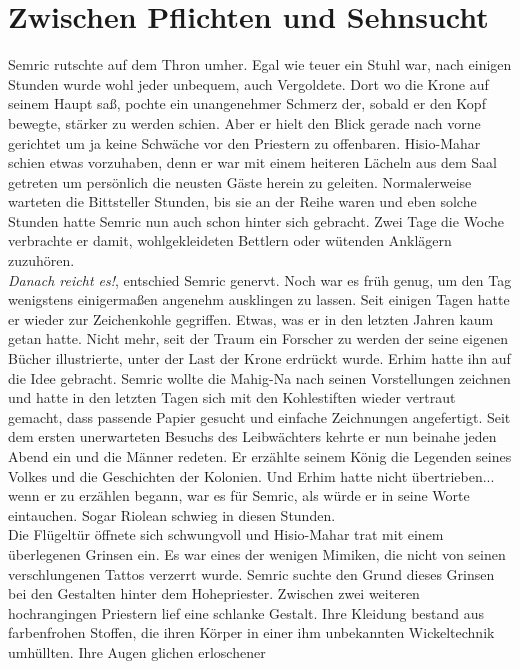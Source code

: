 \chapter{Zwischen Pflichten und Sehnsucht}

Semric rutschte auf dem Thron umher. Egal wie teuer ein Stuhl war, nach einigen Stunden wurde wohl 
jeder unbequem, auch Vergoldete. Dort wo die Krone auf seinem Haupt saß, pochte ein unangenehmer 
Schmerz der, sobald er den Kopf bewegte, stärker zu werden schien. Aber er hielt den Blick gerade 
nach vorne gerichtet um ja keine Schwäche vor den Priestern zu offenbaren. Hisio-Mahar schien etwas 
vorzuhaben, denn er war mit einem heiteren Lächeln aus dem Saal getreten um persönlich die neusten 
Gäste herein zu geleiten. Normalerweise warteten die Bittsteller Stunden, bis sie an der Reihe 
waren und eben solche Stunden hatte Semric nun auch schon hinter sich gebracht. Zwei Tage die Woche 
verbrachte er damit, wohlgekleideten Bettlern oder wütenden Anklägern zuzuhören.\\
\textit{Danach reicht es!}, entschied Semric genervt. Noch war es früh genug, um den Tag wenigstens 
einigermaßen angenehm ausklingen zu lassen. Seit einigen Tagen hatte er wieder zur Zeichenkohle 
gegriffen. Etwas, was er in den letzten Jahren kaum getan hatte. Nicht mehr, seit der Traum ein 
Forscher zu werden der seine eigenen Bücher illustrierte, unter der Last der Krone erdrückt wurde. 
Erhim hatte ihn auf die Idee gebracht. Semric wollte die Mahig-Na nach seinen Vorstellungen 
zeichnen und hatte in den letzten Tagen sich mit den Kohlestiften wieder vertraut gemacht, dass 
passende Papier gesucht und einfache Zeichnungen angefertigt. Seit dem ersten unerwarteten Besuchs 
des Leibwächters kehrte er nun beinahe jeden Abend ein und die Männer redeten. Er erzählte seinem 
König die Legenden seines Volkes und die Geschichten der Kolonien. Und Erhim hatte nicht 
übertrieben... wenn er zu erzählen begann, war es für Semric, als würde er in seine Worte 
eintauchen. Sogar Riolean schwieg in diesen Stunden.\\
Die Flügeltür öffnete sich schwungvoll und Hisio-Mahar trat mit einem überlegenen Grinsen ein. Es 
war eines der wenigen Mimiken, die nicht von seinen verschlungenen Tattos verzerrt wurde. Semric 
suchte den Grund dieses Grinsen bei den Gestalten hinter dem Hohepriester. Zwischen zwei weiteren 
hochrangingen Priestern lief eine schlanke Gestalt. Ihre Kleidung bestand aus farbenfrohen Stoffen, 
die ihren Körper in einer ihm unbekannten Wickeltechnik umhüllten. Ihre Augen glichen erloschener 
